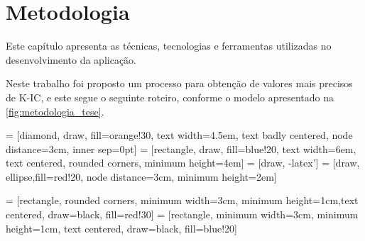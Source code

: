 \chapter{Metodologia}
\label{cap:metodologia}
Este capítulo apresenta as técnicas, tecnologias e ferramentas utilizadas no desenvolvimento da aplicação.

Neste trabalho foi proposto um processo para obtenção de valores mais precisos de \gls{K-IC}, e este segue o seguinte roteiro, conforme o modelo apresentado na \autoref{fig:metodologia_tese}.


 = [diamond, draw, fill=orange!30, 
    text width=4.5em, text badly centered, node distance=3cm, inner sep=0pt]
 = [rectangle, draw, fill=blue!20, 
    text width=6em, text centered, rounded corners, minimum height=4em]
 = [draw, -latex']
 = [draw, ellipse,fill=red!20, node distance=3cm,
    minimum height=2em]

 = [rectangle, rounded corners, minimum width=3cm, minimum height=1cm,text centered, draw=black, fill=red!30]
 = [rectangle, minimum width=3cm, minimum height=1cm, text centered, draw=black, fill=blue!20]

